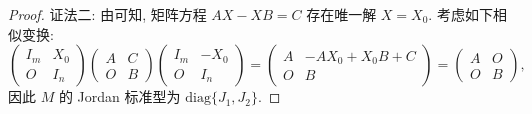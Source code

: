 \documentclass[../../main.tex]{subfiles}
\begin{document}
\begin{proof}
{\color{blue}证法二:}
由可知, 矩阵方程 $AX - XB = C$ 存在唯一解 $X = X_0$. 考虑如下相似变换:
\[
\begin{pmatrix}I_m & X_0 \\ O & I_n\end{pmatrix}
\begin{pmatrix}A & C \\ O & B\end{pmatrix}
\begin{pmatrix}I_m & -X_0 \\ O & I_n\end{pmatrix}
=
\begin{pmatrix}A & -AX_0 + X_0B + C \\ O & B\end{pmatrix}
=
\begin{pmatrix}A & O \\ O & B\end{pmatrix},
\]
因此 $M$ 的 Jordan 标准型为 $\mathrm{diag}\{J_1,J_2\}$. 

\end{proof}
\end{document}
